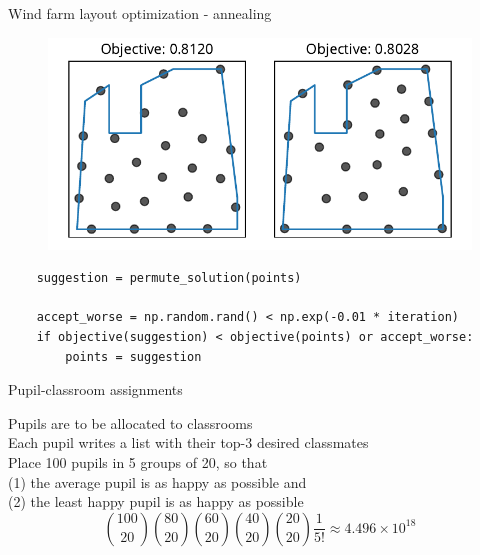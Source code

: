 \documentclass[12pt, aspectratio=149]{beamer}
\theoremstyle{plain}
\begin{document}
\begin{frame}[fragile]{Wind farm layout optimization - annealing}
\vspace*{-1em}
\begin{center}
 \begin{figure}
    	\centering
    	\includegraphics[width=0.99\linewidth]{figures/windfarm_sa}
 \end{figure}
 \end{center}
\vspace*{-2em}
\begin{center}
\begin{verbatim}
    suggestion = permute_solution(points)

    accept_worse = np.random.rand() < np.exp(-0.01 * iteration)
    if objective(suggestion) < objective(points) or accept_worse:
        points = suggestion
\end{verbatim}
\end{center}
\end{frame}


\begin{frame}[fragile]{Pupil-classroom assignments}
\vspace*{-1em}
\begin{center}
Pupils are to be allocated to classrooms\\
Each pupil writes a list with their top-$3$ desired classmates \\
\vspace*{2em} 
Place 100 pupils in 5 groups of 20, so that \\
(1) the average pupil is as happy as possible and \\
(2) the least happy pupil is as happy as possible
\vspace*{1em} 
\begin{equation*}
\binom{100}{20}
\binom{80}{20}
\binom{60}{20}
\binom{40}{20}
\binom{20}{20}
\frac{1}{5!} \approx 4.496 \times 10^{18}
\end{equation*}
\end{center}
\end{frame}
\end{document}
